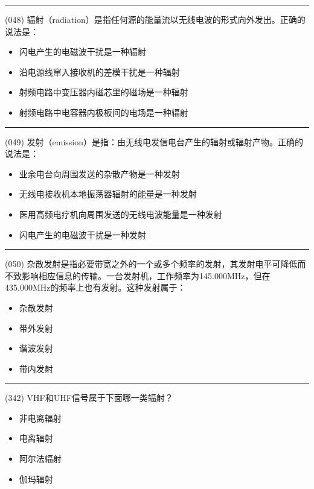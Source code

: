 \documentclass[twocolumn,hyperref,UTF8]{ctexart}  %
\begin{document}
\noindent\rule{0.5\textwidth}{1pt}
\heiti (048) 辐射（radiation）是指任何源的能量流以无线电波的形式向外发出。正确的说法是： \songti {\color{gray} [LK0125] }
\begin{itemize}
	\item  闪电产生的电磁波干扰是一种辐射
	\item  沿电源线窜入接收机的差模干扰是一种辐射
	\item  射频电路中变压器内磁芯里的磁场是一种辐射
	\item  射频电路中电容器内极板间的电场是一种辐射
\end{itemize}


\noindent\rule{0.5\textwidth}{1pt}
\heiti (049) 发射（emission）是指：由无线电发信电台产生的辐射或辐射产物。正确的说法是： \songti {\color{gray} [LK0126] }
\begin{itemize}
	\item  业余电台向周围发送的杂散产物是一种发射
	\item  无线电接收机本地振荡器辐射的能量是一种发射
	\item  医用高频电疗机向周围发送的无线电波能量是一种发射
	\item  闪电产生的电磁波干扰是一种发射
\end{itemize}


\noindent\rule{0.5\textwidth}{1pt}
\heiti (050) 杂散发射是指必要带宽之外的一个或多个频率的发射，其发射电平可降低而不致影响相应信息的传输。一台发射机，工作频率为145.000MHz，但在435.000MHz的频率上也有发射。这种发射属于： \songti {\color{gray} [LK0137] }
\begin{itemize}
	\item  杂散发射
	\item  带外发射
	\item  谐波发射
	\item  带内发射
\end{itemize}


\noindent\rule{0.5\textwidth}{1pt}
\heiti (342) VHF和UHF信号属于下面哪一类辐射？ \songti {\color{gray} [LK1235] }
\begin{itemize}
	\item  非电离辐射
	\item  电离辐射
	\item  阿尔法辐射
	\item  伽玛辐射
\end{itemize}


\clearpage
\end{document}
